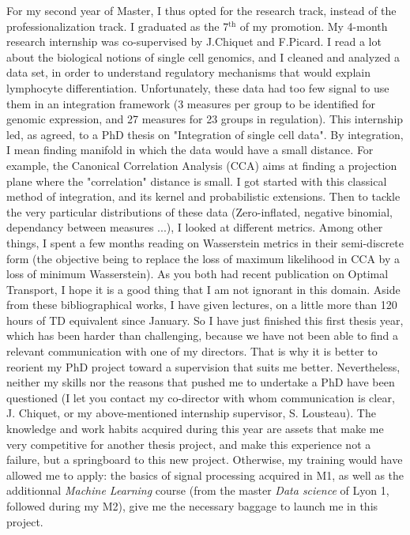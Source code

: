 \documentclass[a4paper,12pt, english]{article}
\begin{document}
For my second year of Master, I thus opted for the research track, instead of the professionalization track. I graduated as the 7$^{\text{th}}$ of my promotion. 
My 4-month research internship was co-supervised by J.Chiquet and F.Picard. I read a lot about the biological notions of single cell genomics, and I cleaned and analyzed a data set, in order to understand regulatory mechanisms that would explain lymphocyte differentiation. Unfortunately, these data had too few signal to use them in an integration framework (3 measures per group to be identified for genomic expression, and 27 measures for 23 groups in regulation). This internship led, as agreed, to a PhD thesis on "Integration of single cell data". 
By integration, I mean finding manifold in which the data would have a small distance. For example, the Canonical Correlation Analysis (CCA) aims at finding a projection plane where the "correlation" distance is small. I got started with this classical method of integration, and its kernel and probabilistic extensions. Then to tackle the very particular distributions of these data (Zero-inflated, negative binomial, dependancy between measures ...), I looked at different metrics. Among other things, I spent a few months reading on Wasserstein metrics in their semi-discrete form (the objective being to replace the loss of maximum likelihood in CCA by a loss of minimum Wasserstein). As you both had recent publication on Optimal Transport, I hope it is a good thing that I am not ignorant in this domain. Aside from these bibliographical works, I have given lectures, on a little more than 120 hours of TD equivalent since January. 
So I have just finished this first thesis year, which has been harder than challenging, because we have not been able to find a relevant communication with one of my directors. That is why it is better to reorient my PhD project toward a supervision that suits me better. 
Nevertheless, neither my skills nor the reasons that pushed me to undertake a PhD have been questioned (I let you contact my co-director with whom communication is clear, J. Chiquet, or my above-mentioned internship supervisor, S. Lousteau). 
The knowledge and work habits acquired during this year are assets that make me very competitive for another thesis project, and make this experience not a failure, but a springboard to this new project. 
%
Otherwise, my training would have allowed me to apply: the basics of signal processing acquired in M1, as well as the additionnal \textit{Machine Learning} course (from the master \textit{Data science} of Lyon 1, followed during my M2), give me the necessary baggage to launch me in this project. 
\end{document}
